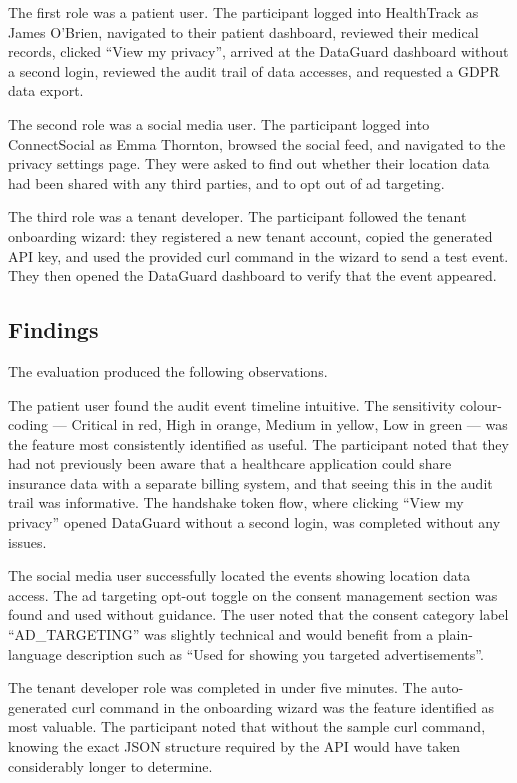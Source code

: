 \documentclass[a4paper,12pt,onecolumn]{report}
\begin{document}
The first role was a patient user.
The participant logged into HealthTrack as James O'Brien, navigated to their patient dashboard, reviewed their medical records, clicked ``View my privacy'', arrived at the DataGuard dashboard without a second login, reviewed the audit trail of data accesses, and requested a GDPR data export.

The second role was a social media user.
The participant logged into ConnectSocial as Emma Thornton, browsed the social feed, and navigated to the privacy settings page.
They were asked to find out whether their location data had been shared with any third parties, and to opt out of ad targeting.

The third role was a tenant developer.
The participant followed the tenant onboarding wizard: they registered a new tenant account, copied the generated API key, and used the provided curl command in the wizard to send a test event.
They then opened the DataGuard dashboard to verify that the event appeared.

\subsection{Findings}

The evaluation produced the following observations.

The patient user found the audit event timeline intuitive.
The sensitivity colour-coding --- Critical in red, High in orange, Medium in yellow, Low in green --- was the feature most consistently identified as useful.
The participant noted that they had not previously been aware that a healthcare application could share insurance data with a separate billing system, and that seeing this in the audit trail was informative.
The handshake token flow, where clicking ``View my privacy'' opened DataGuard without a second login, was completed without any issues.

The social media user successfully located the events showing location data access.
The ad targeting opt-out toggle on the consent management section was found and used without guidance.
The user noted that the consent category label ``AD\_TARGETING'' was slightly technical and would benefit from a plain-language description such as ``Used for showing you targeted advertisements''.

The tenant developer role was completed in under five minutes.
The auto-generated curl command in the onboarding wizard was the feature identified as most valuable.
The participant noted that without the sample curl command, knowing the exact JSON structure required by the API would have taken considerably longer to determine.
\end{document}
